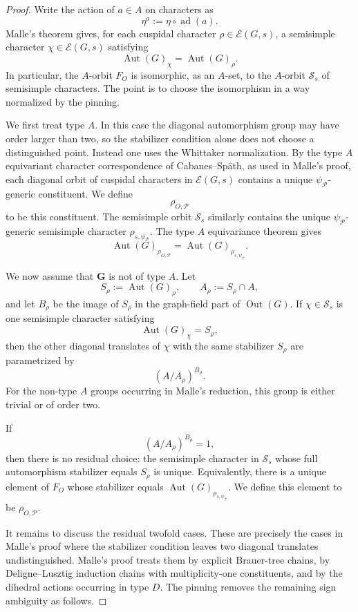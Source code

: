 \documentclass{amsart}
\theoremstyle{plain}
\numberwithin{equation}{section}
\theoremstyle{definition}
\newcommand{\cP}{\mathcal{P}}
\newcommand{\cE}{\mathcal{E}}
\newcommand{\Out}{\operatorname{Out}}
\newcommand{\ad}{\operatorname{ad}}
\newcommand{\Aut}{\operatorname{Aut}}
\begin{document}
\begin{proof}
Write the action of \(a\in A\) on characters as
\[
        \eta^a:=\eta\circ \ad(a).
\]
Malle's theorem gives, for each cuspidal character
\(\rho\in \cE(G,s)\), a semisimple character
\(\chi\in \cE(G,s)\) satisfying
\[
        \Aut(G)_\chi=\Aut(G)_\rho.
\]
In particular, the \(A\)-orbit \(F_O\) is isomorphic, as an \(A\)-set, to the
\(A\)-orbit \(\mathcal S_s\) of semisimple characters.  The point is to choose
the isomorphism in a way normalized by the pinning.

We first treat type \(A\).  In this case the diagonal automorphism group may
have order larger than two, so the stabilizer condition alone does not choose
a distinguished point.  Instead one uses the Whittaker normalization.  By the
type \(A\) equivariant character correspondence of Cabanes--Späth, as used in
Malle's proof, each diagonal orbit of cuspidal characters in \(\cE(G,s)\)
contains a unique \(\psi_{\cP}\)-generic constituent.  We define
\[
        \rho_{O,\cP}
\]
to be this constituent.  The semisimple orbit \(\mathcal S_s\) similarly
contains the unique \(\psi_{\cP}\)-generic semisimple character
\(\rho_{s,\psi_{\cP}}\).  The type \(A\) equivariance theorem gives
\[
        \Aut(G)_{\rho_{O,\cP}}
        =
        \Aut(G)_{\rho_{s,\psi_{\cP}}}.
\]

We now assume that \(\mathbf G\) is not of type \(A\).  Let
\[
        S_\rho:=\Aut(G)_\rho,\qquad A_\rho:=S_\rho\cap A,
\]
and let \(B_\rho\) be the image of \(S_\rho\) in the graph-field part of
\(\Out(G)\).  If \(\chi\in\mathcal S_s\) is one semisimple character satisfying
\[
        \Aut(G)_\chi=S_\rho,
\]
then the other diagonal translates of \(\chi\) with the same stabilizer
\(S_\rho\) are parametrized by
\[
        (A/A_\rho)^{B_\rho}.
\]
For the non-type \(A\) groups occurring in Malle's reduction, this group is
either trivial or of order two.

If
\[
        (A/A_\rho)^{B_\rho}=1,
\]
then there is no residual choice: the semisimple character in
\(\mathcal S_s\) whose full automorphism stabilizer equals \(S_\rho\) is unique.
Equivalently, there is a unique element of \(F_O\) whose stabilizer equals
\(\Aut(G)_{\rho_{s,\psi_{\cP}}}\).  We define this element to be
\(\rho_{O,\cP}\).

It remains to discuss the residual twofold cases.  These are precisely the
cases in Malle's proof where the stabilizer condition leaves two diagonal
translates undistinguished.  Malle's proof treats them by explicit Brauer-tree
chains, by Deligne--Lusztig induction chains with multiplicity-one
constituents, and by the dihedral actions occurring in type \(D\).  The pinning
removes the remaining sign ambiguity as follows.


\end{proof}
\end{document}
